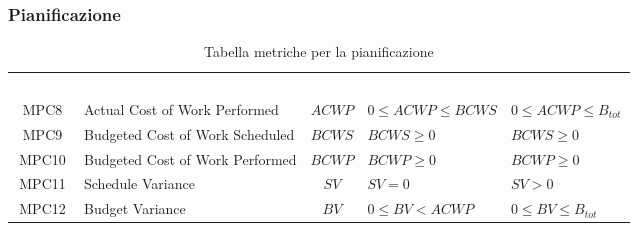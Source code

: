 \subsubsection{Pianificazione}
\renewcommand{\arraystretch}{1.5}
\begin{longtable}{ c C{4cm} c C{3.5cm} C{3.5cm}}
	\caption{Tabella metriche per la pianificazione}\\
	\textcolor{white}{\textbf{Metrica}} & \textcolor{white}{\textbf{Nome}} & \textcolor{white}{\textbf{Sigla}} & \textcolor{white}{\textbf{Range Accettabile}} & \textcolor{white}{\textbf{Range Ottimale}}\\
		MPC8 & Actual Cost of Work Performed & $ACWP$ & $0 \leq ACWP \leq BCWS$ & $0 \leq ACWP \leq B_{tot}$ \\
		MPC9 & Budgeted Cost of Work Scheduled & $BCWS$ & $BCWS \geq 0$ &  $BCWS \geq 0$ \\
		MPC10 & Budgeted Cost of Work Performed & $BCWP$ & $BCWP \geq 0$ & $BCWP \geq 0$ \\
		MPC11 & Schedule Variance & $SV$ & $SV = 0$ & $SV > 0$  \\	
		MPC12 & Budget Variance & $BV$ & $0 \leq BV < ACWP$ & $0 \leq BV \leq B_{tot}$  \\
	\end{longtable}